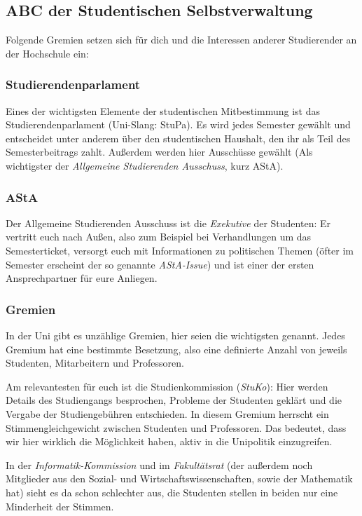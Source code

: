 	\subsection*{ABC der Studentischen Selbstverwaltung}
		Folgende Gremien setzen sich für dich und die Interessen anderer Studierender an der Hochschule ein:

	\subsubsection*{Studierendenparlament}
		Eines der wichtigsten Elemente der studentischen Mitbestimmung ist das Studierendenparlament (Uni-Slang: StuPa). Es wird jedes Semester gewählt und entscheidet unter anderem über den studentischen Haushalt, den ihr als Teil des Semesterbeitrags zahlt. Außerdem werden hier Ausschüsse gewählt (Als wichtigster der \emph{Allgemeine Studierenden Ausschuss}, kurz AStA).

	\subsubsection*{AStA}
		Der Allgemeine Studierenden Ausschuss ist die \emph{Exekutive} der Studenten: Er vertritt euch nach Außen, also zum Beispiel bei Verhandlungen um das Semesterticket, versorgt euch mit Informationen zu politischen Themen (öfter im Semester erscheint der so genannte \emph{AStA-Issue}) und ist einer der ersten Ansprechpartner für eure Anliegen.

	\subsubsection*{Gremien}
		In der Uni gibt es unzählige Gremien, hier seien die wichtigsten genannt. Jedes Gremium hat eine bestimmte Besetzung, also eine definierte Anzahl von jeweils Studenten, Mitarbeitern und Professoren.

		Am relevantesten für euch ist die Studienkommission (\emph{StuKo}): Hier werden Details des Studiengangs besprochen, Probleme der Studenten geklärt und die Vergabe der Studiengebühren entschieden. In diesem Gremium herrscht ein Stimmengleichgewicht zwischen Studenten und Professoren. Das bedeutet, dass wir hier wirklich die Möglichkeit haben, aktiv in die Unipolitik einzugreifen.

		In der \emph{Informatik-Kommission} und im
		\emph{Fakultätsrat} (der außerdem noch Mitglieder aus
		den Sozial- und Wirtschaftswissenschaften, sowie der Mathematik hat) sieht es da schon schlechter aus, die Studenten stellen in beiden nur eine Minderheit der Stimmen.

